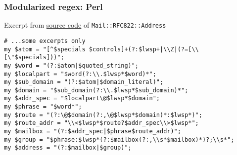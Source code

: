 \begin{frame}[fragile]
  \frametitle{Modularized regex: Perl}

  Excerpt from \href{http://cpansearch.perl.org/src/PDWARREN/Mail-RFC822-Address-0.3/Address.pm}{source code} of \texttt{Mail::RFC822::Address}

  \begin{verbatim}
# ...some excerpts only
my $atom = "[^$specials $controls]+(?:$lwsp+|\\Z|(?=[\\[\"$specials]))";
my $word = "(?:$atom|$quoted_string)";
my $localpart = "$word(?:\\.$lwsp*$word)*";
my $sub_domain = "(?:$atom|$domain_literal)";
my $domain = "$sub_domain(?:\\.$lwsp*$sub_domain)*";
my $addr_spec = "$localpart\@$lwsp*$domain";
my $phrase = "$word*";
my $route = "(?:\@$domain(?:,\@$lwsp*$domain)*:$lwsp*)";
my $route_addr = "\\<$lwsp*$route?$addr_spec\\>$lwsp*";
my $mailbox = "(?:$addr_spec|$phrase$route_addr)";
my $group = "$phrase:$lwsp*(?:$mailbox(?:,\\s*$mailbox)*)?;\\s*";
my $address = "(?:$mailbox|$group)";
  \end{verbatim}
\end{frame}
